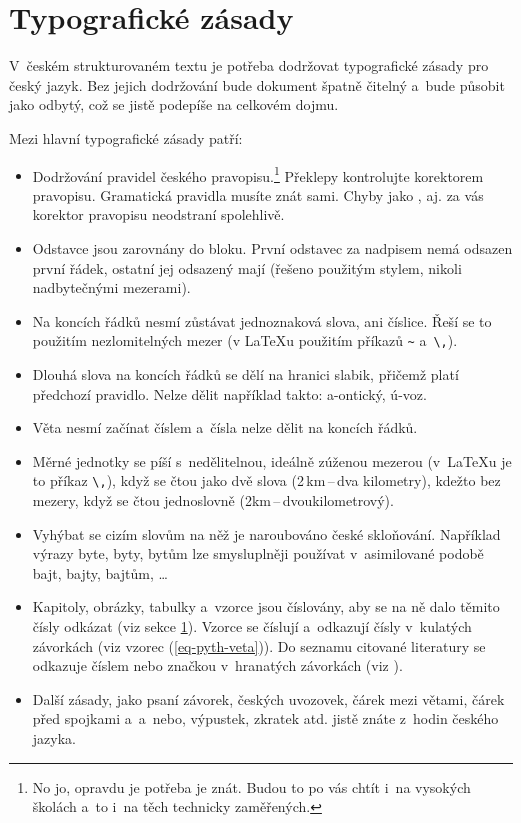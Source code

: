 \section{Typografické zásady}\label{typ-zasady}
V~českém strukturovaném textu je potřeba dodržovat typografické zásady pro český jazyk. Bez jejich dodržování bude dokument špatně čitelný a~bude působit jako odbytý, což se jistě podepíše na celkovém dojmu.

Mezi hlavní typografické zásady patří:
\begin{itemize}
  \item Dodržování pravidel českého pravopisu.\footnote{No jo, opravdu je potřeba je znát. Budou to po vás chtít i~na vysokých školách a~to i~na těch technicky zaměřených.} Překlepy kontrolujte korektorem pravopisu. Gramatická pravidla musíte znát sami. Chyby jako ,  aj. za vás korektor pravopisu neodstraní spolehlivě.
  \item Odstavce jsou zarovnány do bloku. První odstavec za nadpisem nemá odsazen první řádek, ostatní jej  odsazený mají (řešeno použitým stylem, nikoli nadbytečnými mezerami).
  \item Na koncích řádků nesmí zůstávat jednoznaková slova, ani číslice. Řeší se to použitím nezlomitelných mezer (v \LaTeX{u} použitím příkazů \verb|~| a~\verb|\,|).
  \item Dlouhá slova na koncích řádků se dělí na hranici slabik, přičemž platí předchozí pravidlo. Nelze dělit například takto: a-ontický, ú-voz.
  \item Věta nesmí začínat číslem a~čísla nelze dělit na koncích řádků.
  \item Měrné jednotky se píší s~nedělitelnou, ideálně zúženou mezerou (v~\LaTeX{u} je to příkaz \verb|\,|), když se čtou jako dvě slova (2\,km\,--\,dva kilometry), kdežto bez mezery, když se čtou jednoslovně (2km\,--\,dvoukilometrový).
  \item Vyhýbat se cizím slovům na něž je naroubováno české skloňování. Například výrazy byte, byty, bytům lze smysluplněji používat v~asimilované podobě bajt, bajty, bajtům, \dots
  \item Kapitoly, obrázky, tabulky a~vzorce jsou číslovány, aby se na ně dalo těmito čísly odkázat (viz sekce \ref{typ-zasady}). Vzorce se číslují a~odkazují čísly v~kulatých závorkách (viz vzorec (\ref{eq-pyth-veta})). Do seznamu citované literatury se odkazuje číslem nebo značkou v~hranatých závorkách (viz \parencite{rybitex}).
  \item Další zásady, jako psaní závorek, českých uvozovek, čárek mezi větami, čárek před spojkami a~a~nebo, výpustek, zkratek atd. jistě znáte z~hodin českého jazyka.
\end{itemize}


